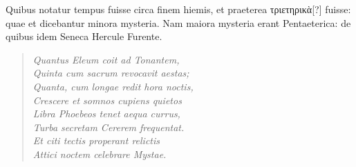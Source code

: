 Quibus notatur tempus fuisse circa finem hiemis, et praeterea
 \textgreek{τριετηρικὰ[?]}
fuisse: quae et dicebantur minora mysteria.
Nam maiora mysteria
erant Pen\-ta\-e\-te\-ri\-ca: de quibus idem Seneca Hercule Furente.
\begin{verse}
  \textit{Quantus Eleum coit ad Tonantem,\\
  Quinta cum sacrum revocavit aestas;\\
  Quanta, cum longae redit hora noctis,\\
  Crescere et somnos cupiens quietos\\
  Libra Phoebeos tenet aequa currus,\\
  Turba secretam Cererem frequentat.\\
  Et citi tectis properant relictis\\
  Attici noctem celebrare Mystae.}
\end{verse}

